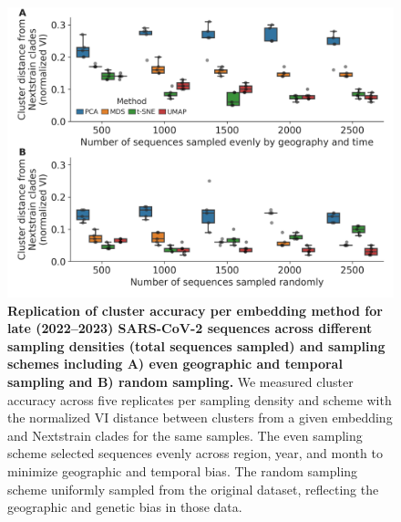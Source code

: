 \begin{figure}[!h]
\includegraphics[width=\columnwidth]{figures/sarscov2-test-replication-of-cluster-accuracy.png}
\caption{{\bf Replication of cluster accuracy per embedding method for late (2022--2023) SARS-CoV-2 sequences across different sampling densities (total sequences sampled) and sampling schemes including A) even geographic and temporal sampling and B) random sampling.}
  We measured cluster accuracy across five replicates per sampling density and scheme with the normalized VI distance between clusters from a given embedding and Nextstrain clades for the same samples.
  The even sampling scheme selected sequences evenly across region, year, and month to minimize geographic and temporal bias.
  The random sampling scheme uniformly sampled from the original dataset, reflecting the geographic and genetic bias in those data.
}\label{S_Fig_late_sarscov2_replication_of_cluster_accuracy}
\end{figure}

